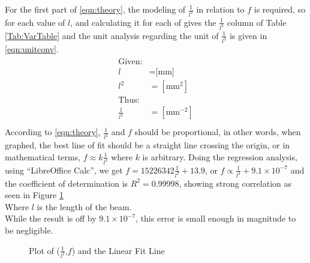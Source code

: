 \documentclass[a4paper,12pt]{article}
\begin{document}
    For the first part of \eqref{eqn:theory}, the modeling of $\frac{1}{l^{2}}$ in relation to $f$ is required, so for each value of $l$, and calculating it for each of gives the $\frac{1}{l^{2}}$ column of Table \ref{Tab:VarTable} and the unit analysis regarding the unit of $\frac{1}{l^{2}}$ is given in \eqref{eqn:unitconv}.
    \begin{align}%
    \label{eqn:unitconv}
    \begin{split}
    \text{Given:}\\
    l&=\text{[mm]}\\
    l^{2}&=[\text{mm}^{2}]\\
    \text{Thus:}\\
    \frac{1}{l^{2}}&=[\text{mm}^{-2}]\\
    \end{split}
    \end{align}
    According to \eqref{eqn:theory}, $\frac{1}{l^{2}}$ and $f$ should be proportional, in other words, when graphed, the best line of fit should be a straight line crossing the origin, or in mathematical terms, $f \approx k \frac{1}{l^{2}}$ where $k$ is arbitrary.
    Doing the regression analysis, using ``LibreOffice Calc'', we get $f=15226342\frac{1}{l^{2}}+13.9$, or $f\propto\frac{1}{l^{2}}+9.1\times10^{-7}$ and the coefficient of determination is $R^{2}=0.99998$, showing strong correlation as seen in Figure \ref{fig:regression}\\
    Where $l$ is the length of the beam.\\
    While the result is off by $9.1\times10^{-7}$, this error is small enough in magnitude to be negligible.
    \begin{figure}[H]%
    \begin{center}

    \caption{Plot of ($\frac{1}{l^{2}}$,$f$) and the Linear Fit Line}\label{fig:regression}
    \end{center}
    \end{figure}
\end{document}
